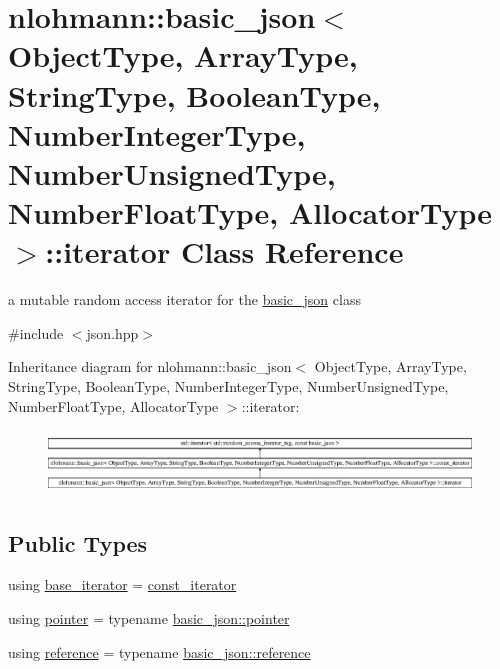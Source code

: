 \hypertarget{classnlohmann_1_1basic__json_1_1iterator}{}\section{nlohmann\+:\+:basic\+\_\+json$<$ Object\+Type, Array\+Type, String\+Type, Boolean\+Type, Number\+Integer\+Type, Number\+Unsigned\+Type, Number\+Float\+Type, Allocator\+Type $>$\+:\+:iterator Class Reference}
\label{classnlohmann_1_1basic__json_1_1iterator}


a mutable random access iterator for the \hyperlink{classnlohmann_1_1basic__json}{basic\+\_\+json} class  




{\ttfamily \#include $<$json.\+hpp$>$}

Inheritance diagram for nlohmann\+:\+:basic\+\_\+json$<$ Object\+Type, Array\+Type, String\+Type, Boolean\+Type, Number\+Integer\+Type, Number\+Unsigned\+Type, Number\+Float\+Type, Allocator\+Type $>$\+:\+:iterator\+:\begin{figure}[H]
\begin{center}
\leavevmode
\includegraphics[height=1.705584cm]{classnlohmann_1_1basic__json_1_1iterator}
\end{center}
\end{figure}
\subsection*{Public Types}
\begin{DoxyCompactItemize}
\item 
using \hyperlink{classnlohmann_1_1basic__json_1_1iterator_ac48754e4dc48d65d95294bd170dcd857}{base\+\_\+iterator} = \hyperlink{classnlohmann_1_1basic__json_1_1const__iterator}{const\+\_\+iterator}
\item 
using \hyperlink{classnlohmann_1_1basic__json_1_1iterator_a3aae1df93a78b201d98e178c1c7d02a7}{pointer} = typename \hyperlink{classnlohmann_1_1basic__json_a9d1b58099dc64695fcf2847ab0b2a7c7}{basic\+\_\+json\+::pointer}
\item 
using \hyperlink{classnlohmann_1_1basic__json_1_1iterator_a97aff5d71246774267a81066460dd1cf}{reference} = typename \hyperlink{classnlohmann_1_1basic__json_a3ec8e17be8732fe436e9d6733f52b7a3}{basic\+\_\+json\+::reference}
\end{DoxyCompactItemize}
